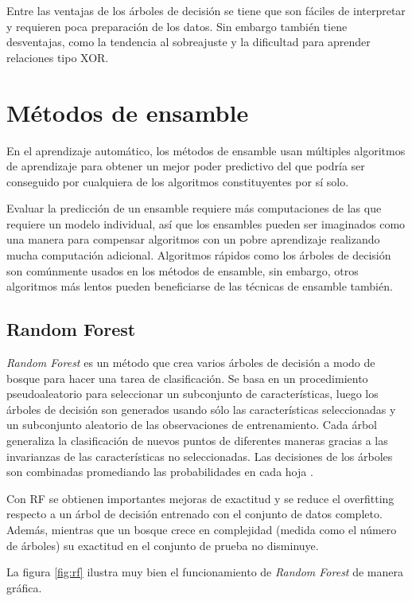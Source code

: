 Entre las ventajas de los árboles de decisión se tiene que son fáciles de interpretar y requieren poca preparación de los datos. Sin embargo también tiene desventajas, como la tendencia al sobreajuste y la dificultad para aprender relaciones tipo XOR.

\section{Métodos de ensamble}

En el aprendizaje automático, los métodos de ensamble usan múltiples algoritmos de aprendizaje para obtener un mejor poder predictivo del que podría ser conseguido por cualquiera de los algoritmos constituyentes por sí solo.

Evaluar la predicción de un ensamble requiere más computaciones de las que requiere un modelo individual, así que los ensambles pueden ser imaginados como una manera para compensar algoritmos con un pobre aprendizaje realizando mucha computación adicional. Algoritmos rápidos como los árboles de decisión son comúnmente usados en los métodos de ensamble, sin embargo, otros algoritmos más lentos pueden beneficiarse de las técnicas de ensamble también.

\subsection{Random Forest}

\textit{Random Forest} es un método que crea varios árboles de decisión a modo de bosque para hacer una tarea de clasificación. Se basa en un procedimiento pseudoaleatorio para seleccionar un subconjunto de características, luego los árboles de decisión son generados usando sólo las características seleccionadas y un subconjunto aleatorio de las observaciones de entrenamiento. Cada árbol generaliza la clasificación de nuevos puntos de diferentes maneras gracias a las invarianzas de las características no seleccionadas. Las decisiones de los árboles son combinadas promediando las probabilidades en cada hoja \citep{ho1998random}.

Con \ac{RF} se obtienen importantes mejoras de exactitud y se reduce el overfitting respecto a un árbol de decisión entrenado con el conjunto de datos completo. Además, mientras que un bosque crece en complejidad (medida como el número de árboles) su exactitud en el conjunto de prueba no disminuye.

La figura \ref{fig:rf} ilustra muy bien el funcionamiento de \textit{Random Forest} de manera gráfica.

